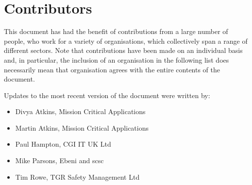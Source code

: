 %
%
\chapter{Contributors} \label{bkm:contributors}


This document has had the benefit of contributions from a large number of people, who work for a variety of organisations, which collectively span a range of different sectors. Note that contributions  have been made on an individual basis and, in particular, the inclusion of an organisation in the following list does  necessarily mean that organisation agrees with the entire contents of the document.

Updates to the most recent version of the document were written by:
\begin{itemize}
  \item Divya Atkins, Mission Critical Applications
  \item Martin Atkins, Mission Critical Applications
  \item Paul Hampton, CGI IT UK Ltd
  \item Mike Parsons, Ebeni and \gls{scsc}
  \item Tim Rowe, TGR Safety Management Ltd
\end{itemize}

  
